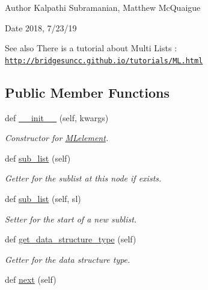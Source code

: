\begin{DoxyAuthor}{Author}
Kalpathi Subramanian, Matthew Mc\+Quaigue
\end{DoxyAuthor}
\begin{DoxyDate}{Date}
2018, 7/23/19
\end{DoxyDate}
\begin{DoxySeeAlso}{See also}
There is a tutorial about Multi Lists \+: \href{http://bridgesuncc.github.io/tutorials/ML.html}{\tt http\+://bridgesuncc.\+github.\+io/tutorials/\+M\+L.\+html} 
\end{DoxySeeAlso}
\subsection*{Public Member Functions}
\begin{DoxyCompactItemize}
\item 
def \mbox{\hyperlink{classbridges_1_1ml__element_1_1_m_lelement_ae0242b9e3f2d7d7ccc702ef0bc7a61ba}{\+\_\+\+\_\+init\+\_\+\+\_\+}} (self, kwargs)
\begin{DoxyCompactList}\small\item\em Constructor for \mbox{\hyperlink{classbridges_1_1ml__element_1_1_m_lelement}{M\+Lelement}}. \end{DoxyCompactList}\item 
def \mbox{\hyperlink{classbridges_1_1ml__element_1_1_m_lelement_a1b02783280dacd20982bb06a1e3070f4}{sub\+\_\+list}} (self)
\begin{DoxyCompactList}\small\item\em Getter for the sublist at this node if exists. \end{DoxyCompactList}\item 
def \mbox{\hyperlink{classbridges_1_1ml__element_1_1_m_lelement_a8ad12079b474fb676f49aed7bacd5e10}{sub\+\_\+list}} (self, sl)
\begin{DoxyCompactList}\small\item\em Setter for the start of a new sublist. \end{DoxyCompactList}\item 
def \mbox{\hyperlink{classbridges_1_1ml__element_1_1_m_lelement_a97693d616263a8ee59b066829e8ce7e8}{get\+\_\+data\+\_\+structure\+\_\+type}} (self)
\begin{DoxyCompactList}\small\item\em Getter for the data structure type. \end{DoxyCompactList}\item 
def \mbox{\hyperlink{classbridges_1_1ml__element_1_1_m_lelement_a951d30261514e6eaefdd7d60f1c77f73}{next}} (self)

\end{DoxyCompactItemize}
